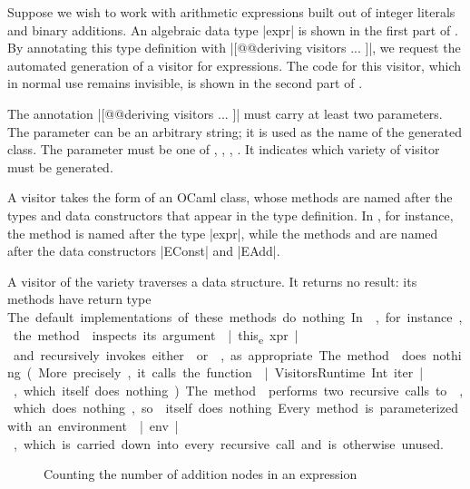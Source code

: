 \documentclass[onecolumn,11pt,nocopyrightspace]{sigplanconf}
\begin{document}
Suppose we wish to work with arithmetic expressions built out of integer
literals and binary additions. An algebraic data type \oc|expr| is shown in
the first part of . By annotating this type definition with
\oc|[@@deriving visitors { ... }]|, we request the automated generation of
a visitor for expressions. The code for this visitor, which in normal use
remains invisible, is shown in the second part of .

The annotation \oc|[@@deriving visitors { ... }]| must carry at least two
parameters. The parameter \name can be an arbitrary string; it is used as the
name of the generated class. The parameter \variety must be one of \iter,
\map, \itertwo, \maptwo. It indicates which variety of visitor must be
generated.

A visitor takes the form of an OCaml class, whose methods are named after the
types and data constructors that appear in the type definition. In
, for instance, the method  is named after
the type \oc|expr|, while the methods  and
 are named after the data constructors \oc|EConst| and
\oc|EAdd|.

A visitor of the \iter variety traverses a data structure. It returns no
result: its methods have return type \unit. The default implementations of
these methods do nothing. In , for instance, the method
 inspects its argument \oc|this_expr| and recursively
invokes either  or , as
appropriate. The method  does nothing. (More precisely,
it calls the function \oc|VisitorsRuntime.Int.iter|, which itself does
nothing.) The method  performs two recursive calls to
, which does nothing, so  itself does
nothing.

Every method is parameterized with an environment \oc|env|, which is carried
down into every recursive call and is otherwise unused.

\begin{figure}[t]
\begin{origenv}

\end{origenv}
\caption{Counting the number of addition nodes in an expression}
\label{fig:expr04}
\end{figure}
\end{document}
